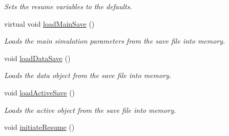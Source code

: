 \begin{DoxyCompactItemize}
\begin{DoxyCompactList}\small\item\em Sets the resume variables to the defaults. \end{DoxyCompactList}\item 
virtual void \hyperlink{class_tree_af57075728924141c7b6d311822a22dc0}{load\+Main\+Save} ()\hypertarget{class_tree_af57075728924141c7b6d311822a22dc0}{}\label{class_tree_af57075728924141c7b6d311822a22dc0}

\begin{DoxyCompactList}\small\item\em Loads the main simulation parameters from the save file into memory. \end{DoxyCompactList}\item 
void \hyperlink{class_tree_af7db53d4870d845741d3159f57b73b30}{load\+Data\+Save} ()\hypertarget{class_tree_af7db53d4870d845741d3159f57b73b30}{}\label{class_tree_af7db53d4870d845741d3159f57b73b30}

\begin{DoxyCompactList}\small\item\em Loads the data object from the save file into memory. \end{DoxyCompactList}\item 
void \hyperlink{class_tree_af145148202f11654d6d6a15a6c021924}{load\+Active\+Save} ()\hypertarget{class_tree_af145148202f11654d6d6a15a6c021924}{}\label{class_tree_af145148202f11654d6d6a15a6c021924}

\begin{DoxyCompactList}\small\item\em Loads the active object from the save file into memory. \end{DoxyCompactList}\item 
void \hyperlink{class_tree_a8cfe5d30d53d702f18cd67981e2c9acb}{initiate\+Resume} ()\hypertarget{class_tree_a8cfe5d30d53d702f18cd67981e2c9acb}{}\label{class_tree_a8cfe5d30d53d702f18cd67981e2c9acb}


\end{DoxyCompactItemize}
